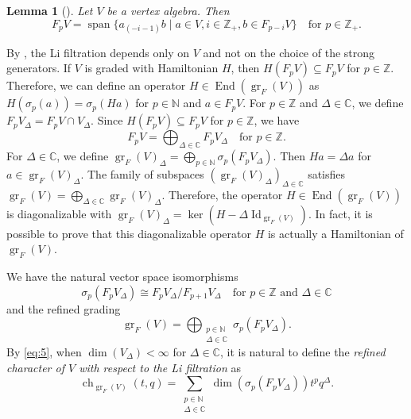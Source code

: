 \documentclass[a4paper, 12pt, reqno]{amsart}
\newtheorem{lemma}[theorem]{Lemma}
\theoremstyle{remark}
\DeclareMathOperator{\ch}{ch}
\DeclareMathOperator{\gr}{gr}
\DeclareMathOperator{\vspan}{span}
\DeclareMathOperator{\End}{End}
\DeclareMathOperator{\Id}{Id}
\begin{document}
\begin{lemma}[{\cite[Lemma 2.9]{li_abelianizing_2005}}]
  \label{lmm:4}
  Let $V$ be a vertex algebra.
  Then
  \begin{equation*}
    F_pV = \vspan\{a_{(-i - 1)}b \mid a \in V, i \in \mathbb{Z}_+, b \in F_{p - i}V\} \quad \text{for $p \in \mathbb{Z}_+$}.
  \end{equation*}
\end{lemma}

By , the Li filtration depends only on $V$ and not on the choice of the strong generators.
If $V$ is graded with Hamiltonian $H$, then $H(F_pV) \subseteq F_pV$ for $p \in \mathbb{Z}$.
Therefore, we can define an operator $H \in \End(\gr_F(V))$ as $H(\sigma_p(a)) = \sigma_p(Ha)$ for $p \in \mathbb{N}$ and $a \in F_pV$.
For $p \in \mathbb{Z}$ and $\Delta \in \mathbb{C}$, we define $F_pV_{\Delta} = F_pV \cap V_{\Delta}$.
Since $H(F_pV) \subseteq F_pV$ for $p \in \mathbb{Z}$, we have
\begin{equation*}
  F_pV = \bigoplus_{\Delta \in \mathbb{C}}F_pV_{\Delta} \quad \text{for $p \in \mathbb{Z}$}.
\end{equation*}
For $\Delta \in \mathbb{C}$, we define $\gr_F(V)_{\Delta} = \bigoplus_{p \in \mathbb{N}}\sigma_p(F_pV_{\Delta})$.
Then $Ha = \Delta a$ for $a \in \gr_F(V)_{\Delta}$.
The family of subspaces $(\gr_F(V)_{\Delta})_{\Delta \in \mathbb{C}}$ satisfies $\gr_F(V) = \bigoplus_{\Delta \in \mathbb{C}}\gr_F(V)_{\Delta}$.
Therefore, the operator $H \in \End(\gr_F(V))$ is diagonalizable with $\gr_F(V)_{\Delta} = \ker(H - \Delta\Id_{\gr_F(V)})$.
In fact, it is possible to prove that this diagonalizable operator $H$ is actually a Hamiltonian of $\gr_F(V)$.

We have the natural vector space isomorphisms
\begin{equation*}
  \sigma_p(F_pV_{\Delta}) \cong F_pV_{\Delta}/F_{p + 1}V_{\Delta} \quad \text{for $p \in \mathbb{Z}$ and $\Delta \in \mathbb{C}$}
\end{equation*}
and the refined grading
\begin{equation}
  \label{eq:5}
  \gr_F(V) = \bigoplus_{\substack{p \in \mathbb{N} \\ \Delta \in \mathbb{C}}}\sigma_p(F_pV_{\Delta}).
\end{equation}
By \eqref{eq:5}, when $\dim(V_{\Delta}) < \infty$ for $\Delta \in \mathbb{C}$, it is natural to define the \emph{refined character of $V$ with respect to the Li filtration} as
\begin{equation*}
  \ch_{\gr_F(V)}(t, q) = \sum_{\substack{p \in \mathbb{N} \\ \Delta \in \mathbb{C}}}\dim(\sigma_p(F_pV_{\Delta}))t^pq^{\Delta}.
\end{equation*}
\end{document}
